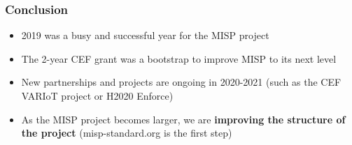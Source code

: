 \begin{frame}
        \frametitle{Conclusion}
        \begin{itemize}
                \item 2019 was a busy and successful year for the MISP project
                \item The 2-year CEF grant was a bootstrap to improve MISP to its next level
                \item New partnerships and projects are ongoing in 2020-2021 (such as the CEF VARIoT project or H2020 Enforce)
                \item As the MISP project becomes larger, we are {\bf improving the structure of the project} (misp-standard.org is the first step)
        \end{itemize}
\end{frame}

